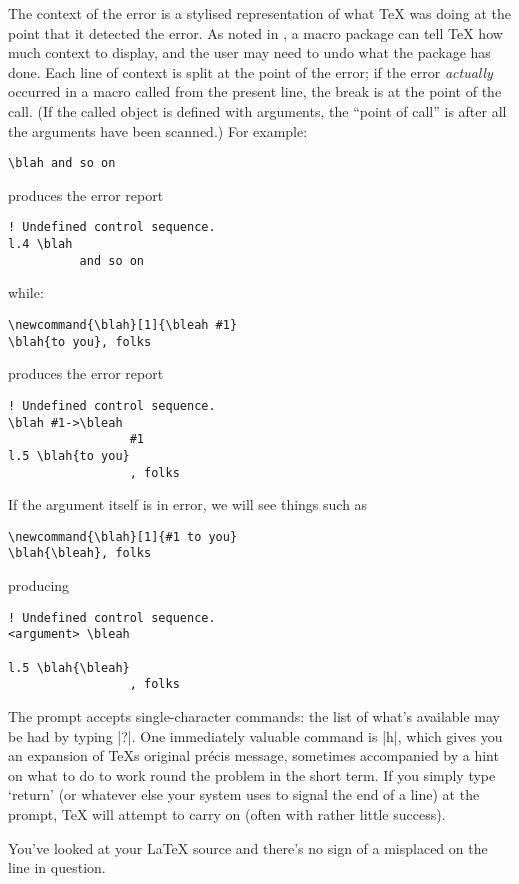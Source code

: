 The context of the error is a stylised representation of what \TeX{}
was doing at the point that it detected the error.  As noted in
, a macro package
can tell \TeX{} how much context to display, and the user may need to
undo what the package has done.  Each line of context is split at the
point of the error; if the error \emph{actually} occurred in a macro
called from the present line, the break is at the point of the call.
(If the called object is defined with arguments, the ``point of call''
is after all the arguments have been scanned.)  For example:
\begin{verbatim}
\blah and so on
\end{verbatim}
produces the error report
\begin{verbatim}
! Undefined control sequence.
l.4 \blah
          and so on
\end{verbatim}
while:
\begin{verbatim}
\newcommand{\blah}[1]{\bleah #1}
\blah{to you}, folks
\end{verbatim}
produces the error report
\begin{verbatim}
! Undefined control sequence.
\blah #1->\bleah 
                 #1
l.5 \blah{to you}
                 , folks
\end{verbatim}
If the argument itself is in error, we will see things such as
\begin{verbatim}
\newcommand{\blah}[1]{#1 to you}
\blah{\bleah}, folks
\end{verbatim}
producing
\begin{verbatim}
! Undefined control sequence.
<argument> \bleah 
                  
l.5 \blah{\bleah}
                 , folks
\end{verbatim}

The prompt accepts single-character commands: the list of what's
available may be had by typing |?|\@.  One immediately valuable
command is |h|, which gives you an expansion of \TeX{}s original
pr\'ecis message, sometimes accompanied by a hint on what to do to
work round the problem in the short term.  If you simply type `return'
(or whatever else your system uses to signal the end of a line) at the
prompt, \TeX{} will attempt to carry on (often with rather little
success).


You've looked at your \LaTeX{} source and there's no sign of a misplaced
\texttt{\cbracesymbol{}} on the line in question.

